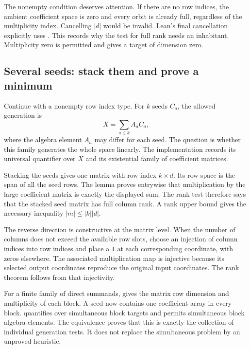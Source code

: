 
The nonempty condition deserves attention. If there are no row indices, the ambient coefficient space is zero and every orbit is already full, regardless of the multiplicity index. Cancelling $|d|$ would be invalid. Lean's final cancellation explicitly uses . This records why the test for full rank needs an inhabitant. Multiplicity zero is permitted and gives a target of dimension zero.

\subsection{Several seeds: stack them and prove a minimum}
Continue with a nonempty row index type. For $k$ seeds $C_a$, the allowed generation is
\[
X=\sum_{a\in k}A_aC_a,
\]
where the algebra element $A_a$ may differ for each seed. The question is whether this family generates the whole space linearly. The implementation records its universal quantifier over $X$ and its existential family of coefficient matrices.


Stacking the seeds gives one matrix with row index $k\times d$. Its row space is the span of all the seed rows. The lemma  proves entrywise that multiplication by the large coefficient matrix is exactly the displayed sum. The rank test therefore says that the stacked seed matrix has full column rank. A rank upper bound gives the necessary inequality $|m|\le |k||d|$.

The reverse direction is constructive at the matrix level. When the number of columns does not exceed the available row slots, choose an injection of column indices into row indices and place a $1$ at each corresponding coordinate, with zeros elsewhere. The associated multiplication map is injective because its selected output coordinates reproduce the original input coordinates. The rank theorem follows from that injectivity.


For a finite family of direct summands,  gives the matrix row dimension and multiplicity of each block. A seed now contains one coefficient array in every block.  quantifies over simultaneous block targets and permits simultaneous block algebra elements. The equivalence  proves that this is exactly the collection of individual generation tests. It does not replace the simultaneous problem by an unproved heuristic.

